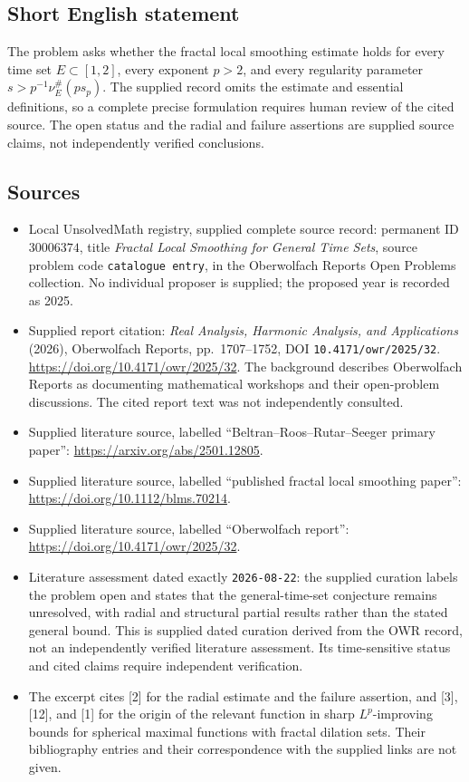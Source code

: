 \documentclass[11pt]{article}
\begin{document}
\subsection{Short English statement}
The problem asks whether the fractal local smoothing estimate holds for every time set \(E\subset[1,2]\), every exponent \(p>2\), and every regularity parameter \(s>p^{-1}\nu_E^{\#}(p s_p)\). The supplied record omits the estimate and essential definitions, so a complete precise formulation requires human review of the cited source. The open status and the radial and failure assertions are supplied source claims, not independently verified conclusions.
\subsection{Sources}
\begin{itemize}
\item Local UnsolvedMath registry, supplied complete source record: permanent ID \(30006374\), title \emph{Fractal Local Smoothing for General Time Sets}, source problem code \texttt{catalogue entry}, in the Oberwolfach Reports Open Problems collection. No individual proposer is supplied; the proposed year is recorded as 2025.
\item Supplied report citation: \emph{Real Analysis, Harmonic Analysis, and Applications} (2026), Oberwolfach Reports, pp.\ 1707--1752, DOI \texttt{10.4171/owr/2025/32}. \url{https://doi.org/10.4171/owr/2025/32}. The background describes Oberwolfach Reports as documenting mathematical workshops and their open-problem discussions. The cited report text was not independently consulted.
\item Supplied literature source, labelled ``Beltran--Roos--Rutar--Seeger primary paper'': \url{https://arxiv.org/abs/2501.12805}.
\item Supplied literature source, labelled ``published fractal local smoothing paper'': \url{https://doi.org/10.1112/blms.70214}.
\item Supplied literature source, labelled ``Oberwolfach report'': \url{https://doi.org/10.4171/owr/2025/32}.
\item Literature assessment dated exactly \texttt{2026-08-22}: the supplied curation labels the problem open and states that the general-time-set conjecture remains unresolved, with radial and structural partial results rather than the stated general bound. This is supplied dated curation derived from the OWR record, not an independently verified literature assessment. Its time-sensitive status and cited claims require independent verification.
\item The excerpt cites [2] for the radial estimate and the failure assertion, and [3], [12], and [1] for the origin of the relevant function in sharp \(L^p\)-improving bounds for spherical maximal functions with fractal dilation sets. Their bibliography entries and their correspondence with the supplied links are not given.
\end{itemize}
\end{document}
